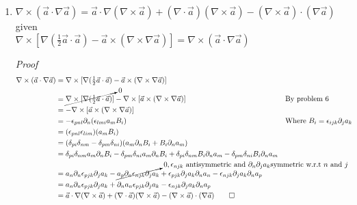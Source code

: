 \documentclass[11pt,twoside]{article}
\renewcommand{\d}{\partial}
\newcommand{\vect}[1]{\vec{#1}}
\newcommand{\grad}{\nabla}
\newcommand{\cross}{\times}
\newcommand{\inline}[1]{\mbox{$#1$}}
\begin{document}
\begin{enumerate}
\newpage
%
%
\item $\grad\cross(\vect{a}\cdot\grad\vect{a}) = \vect{a}\cdot\grad(\grad\cross\vect{a})+(\grad\cdot\vect{a})(\grad\cross\vect{a})- (\grad\cross\vect{a})\cdot(\grad\vect{a})$\\
given \\
$\grad\cross[\grad(\inline{\frac{1}{2}}\vect{a}\cdot\vect{a})-\vect{a}\cross(\grad\cross\grad\vect{a})] = \grad\cross(\vect{a}\cdot\grad\vect{a})$

\textit{Proof}
\begin{align*}
\grad\cross(\vect{a}\cdot\grad\vect{a}) 
       & = \grad\cross[\grad(\inline{\frac{1}{2}}\vect{a}\cdot\vect{a})-\vect{a}\cross(\grad\cross\grad\vect{a})] \\
       & = \cancelto{0}{\grad\cross[\grad(\inline{\frac{1}{2}}\vect{a}\cdot\vect{a})]}-\grad\cross[\vect{a}\cross(\grad\cross\grad\vect{a})] && \text{By problem 6}\\
       & = - \grad\cross[\vect{a}\cross(\grad\cross\grad\vect{a})]\\
       & = -\epsilon_{pnl}\d_n(\epsilon_{lmi}a_m B_i) && \text{Where $B_i=\epsilon_{ijk}\d_ja_k$}\\
       & = (\epsilon_{pnl}\epsilon_{lim})(a_m B_i)\\
       & = (\delta_{pi}\delta_{nm}-\delta_{pm}\delta_{ni})(a_m\d_nB_i+B_i\d_na_m)\\
       & = \delta_{pi}\delta_{nm}a_m\d_nB_i-\delta_{pm}\delta_{ni}a_m\d_nB_i + \delta_{pi}\delta_{nm}B_i\d_na_m-\delta_{pm}\delta_{ni}B_i\d_na_m\\
       & = a_n\d_n\epsilon_{pjk}\d_ja_k - \cancelto{0, \epsilon_{njk} \mbox{ antisymmetric and }\d_n\d_ja_k \mbox{symmetric w.r.t $n$ and $j$}}{a_p\d_n\epsilon_{njk}\d_ja_k} + \epsilon_{pjk}\d_ja_k\d_na_n - \epsilon_{njk}\d_ja_k\d_na_p\\
       & = a_n\d_n\epsilon_{pjk}\d_ja_k + \d_na_n\epsilon_{pjk}\d_ja_k - \epsilon_{njk}\d_ja_k\d_na_p\\
       & = \vect{a}\cdot\grad(\grad\cross\vect{a})+(\grad\cdot\vect{a})(\grad\cross\vect{a})- (\grad\cross\vect{a})\cdot(\grad\vect{a}) \qed
\end{align*}


\end{enumerate}
\end{document}

